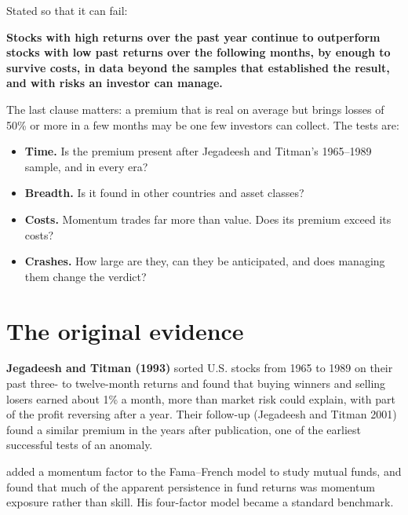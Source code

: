 Stated so that it can fail:

\begin{callout}
\textbf{Stocks with high returns over the past year continue to outperform stocks with low past returns over the following months, by enough to survive costs, in data beyond the samples that established the result, and with risks an investor can manage.}
\end{callout}

The last clause matters: a premium that is real on average but brings losses of 50\% or more in a few months may be one few investors can collect. The tests are:

\begin{itemize}
  \item \textbf{Time.} Is the premium present after Jegadeesh and Titman's 1965--1989 sample, and in every era?
  \item \textbf{Breadth.} Is it found in other countries and asset classes?
  \item \textbf{Costs.} Momentum trades far more than value. Does its premium exceed its costs?
  \item \textbf{Crashes.} How large are they, can they be anticipated, and does managing them change the verdict?
\end{itemize}

\section{The original evidence}
\label{sec:05-evidence}

\textbf{Jegadeesh and Titman (1993)} sorted U.S. stocks from 1965 to 1989 on their past three- to twelve-month returns and found that buying winners and selling losers earned about 1\% a month, more than market risk could explain, with part of the profit reversing after a year. Their follow-up (Jegadeesh and Titman 2001) found a similar premium in the years after publication, one of the earliest successful  tests of an anomaly.

 added a momentum factor to the Fama--French model to study mutual funds, and found that much of the apparent persistence in fund returns was momentum exposure rather than skill. His four-factor model became a standard benchmark.

